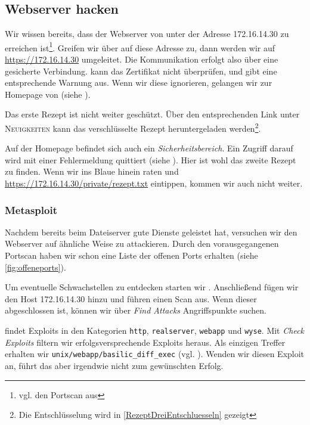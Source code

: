 \subsection{Webserver hacken}

Wir wissen bereits, dass der Webserver von \Mayerbrot{} unter der Adresse
172.16.14.30 zu erreichen ist\footnote{vgl. den Portscan aus
  }. Greifen wir über \Firefox{} auf diese Adresse zu,
dann werden wir auf \url{https://172.16.14.30} umgeleitet. Die Kommunikation
erfolgt also über eine gesicherte Verbindung. \Firefox{} kann das Zertifikat
nicht überprüfen, und gibt eine entsprechende Warnung aus. Wenn wir diese
ignorieren, gelangen wir zur Homepage von \Mayerbrot{} (siehe
).


Das erste Rezept ist nicht weiter geschützt. Über den entsprechenden Link unter
\textsc{Neuigkeiten} kann das verschlüsselte Rezept heruntergeladen
werden\footnote{Die Entschlüsselung wird in \cref{RezeptDreiEntschluesseln}
  gezeigt}.

Auf der Homepage befindet sich auch ein \emph{Sicherheitsbereich}. Ein Zugriff
darauf wird mit einer Fehlermeldung quittiert (siehe
). Hier ist wohl das zweite Rezept zu finden. Wenn wir
ins Blaue hinein raten und \url{https://172.16.14.30/private/rezept.txt}
eintippen, kommen wir auch nicht weiter.


\subsubsection{Metasploit}

Nachdem \Metasploit{} bereits beim Dateiserver gute Dienste geleistet hat,
versuchen wir den Webserver auf ähnliche Weise zu attackieren. Durch den
vorausgegangenen Portscan haben wir schon eine Liste der
offenen Ports erhalten (siehe \cref{fig:offeneports}).

Um eventuelle Schwachstellen zu entdecken starten wir \Armitage{}. Anschließend
fügen wir den Host 172.16.14.30 hinzu und führen einen Scan aus. Wenn dieser
abgeschlossen ist, können wir über \emph{\glqq{}Find Attacks\grqq{}}
Angriffspunkte suchen.

\Armitage{} findet Exploits in den Kategorien \texttt{http},
\texttt{realserver}, \texttt{webapp} und \texttt{wyse}. Mit \emph{\glqq{}Check
  Exploits\grqq{}} filtern wir erfolgsversprechende Exploits heraus. Als
einzigen Treffer erhalten wir \texttt{unix/webapp/basilic\_diff\_exec}
(vgl. ). Wenden wir diesen Exploit an, führt das aber
irgendwie nicht zum gewünschten Erfolg.

